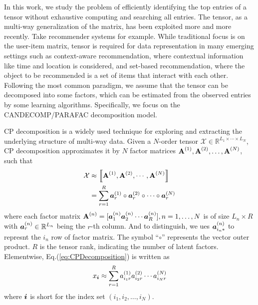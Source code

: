 \documentclass[letterpaper]{article}
\newcommand{\Sca}[3]{{#1}^{(#2)}_{i_#2#3}}%
\newcommand{\anr}[2]{\Sca{a}{#1}{#2}}
\newcommand{\T}[1]{\mathcal{#1}}
\newcommand{\KT}[1]{\left\llbracket #1 \right\rrbracket}
\newcommand{\V}[1]{{\boldsymbol{{\MakeLowercase{#1}}}}}
\newcommand{\VnC}[3]{\V{#1}^{(#2)}_{#3}}
\newcommand{\Varow}[1]{\V{a}^{(#1)}_{i_#1*}}
\newcommand{\M}[1]{{\textbf{{\MakeUppercase{#1}}}}}
\newcommand{\Mn}[2]{\M{#1}^{(#2)}}
\newcommand{\Eqn}[1]   {Eq.(\ref{eq:#1})}
\begin{document}
In this work, 
we study the problem of efficiently identifying the top entries of a tensor 
without exhaustive computing and searching all entries. 
The tensor, as a multi-way generalization of the matrix, 
has been exploited more and more recently. 
Take recommender systems for example. 
While traditional focus is on the user-item matrix\cite{KoYe09}, 
tensor\cite{Rendle_PITF,HuYiLa15} is required for data representation in many emerging settings 
such as context-aware recommendation, 
where contextual information like time and location is considered, and set-based recommendation, 
where the object to be recommended is a set of items that interact with each other. 
Following the most common paradigm, we assume that the tensor can be decomposed into some factors, 
which can be estimated from the observed entries by some learning algorithms. 
Specifically, we focus on the CANDECOMP/PARAFAC decomposition model.

CP decomposition\cite{KoBa09} is a widely used technique for exploring and 
extracting the underlying structure of multi-way data. 
Given a $N$-order tensor $\T{X}\in\mathbb{R}^{L_1\times \cdots\times L_N}$, 
CP decomposition approximates it by $N$ factor matrices $\Mn{A}{1},\Mn{A}{2},\ldots,\Mn{A}{N}$, 
such that
\begin{align}
\label{eq:CPDecomposition}
\T{X}&\approx\KT{\Mn{A}{1},\Mn{A}{2},\cdots,\Mn{A}{N}} \\ \notag
&=\sum_{r=1}^R\VnC{a}{1}{r}\circ\VnC{a}{2}{r}\circ\cdots\circ\VnC{a}{N}{r}
\end{align}
where each factor matrix 
$\Mn{A}{n}=[\VnC{a}{n}{1}\VnC{a}{n}{2}\cdots\VnC{a}{n}{R}], n=1,\ldots,N$
is of size $L_n\times R$ with $\VnC{a}{n}{r}\in\mathbb{R}^{L_n}$ 
being the $r$-th column.
And to distinguish, we ues $\Varow{n}$ to represnt the $i_n$ row of factor matrix.
The symbol ``$\circ$'' represents the vector outer product. 
$R$ is the tensor rank, indicating the number of latent factors. 
Elementwise, \Eqn{CPDecomposition} is written as
\begin{align}
\label{eq:CPValue}
x_\V{i} \approx \sum_{r=1}^{R}\anr{1}{r}\anr{2}{r}\cdots\anr{N}{r}
\end{align}
where $\V{i}$ is short for the index set $(i_1,i_2,\ldots,i_N)$.
\end{document}
